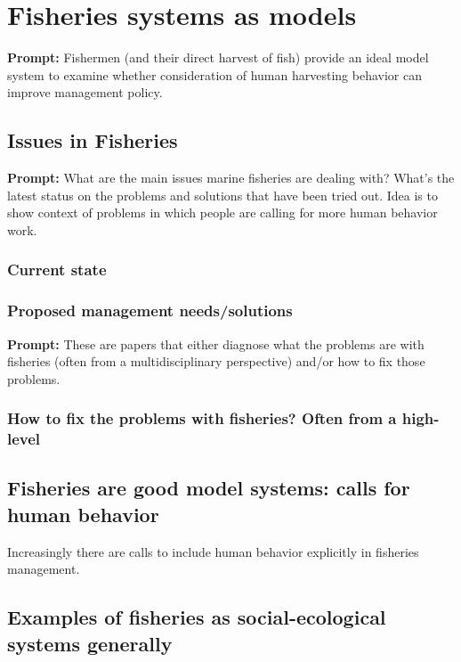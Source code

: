 \documentclass[a4paper,10pt]{report}
\begin{document}
\section{Fisheries systems as models}
{\bf Prompt:} Fishermen (and their direct harvest of fish) provide an ideal model system to examine whether consideration of human harvesting behavior can improve management policy. 

\subsection{Issues in Fisheries}
{\bf Prompt:} What are the main issues marine fisheries are dealing with? What's the latest status on the problems and solutions that have been tried out. Idea is to show context of problems in which people are calling for more human behavior work. 
\subsubsection{Current state}

\subsubsection{Proposed management needs/solutions}
{\bf Prompt:} These are papers that either diagnose what the problems are with fisheries (often from a multidisciplinary perspective) and/or how to fix those problems. 

\subsubsection{How to fix the problems with fisheries? Often from a high-level}

\subsection{Fisheries are good model systems: calls for human behavior}
Increasingly there are calls to include human behavior explicitly in fisheries management.


\subsection{Examples of fisheries as social-ecological systems generally}

\end{document}
